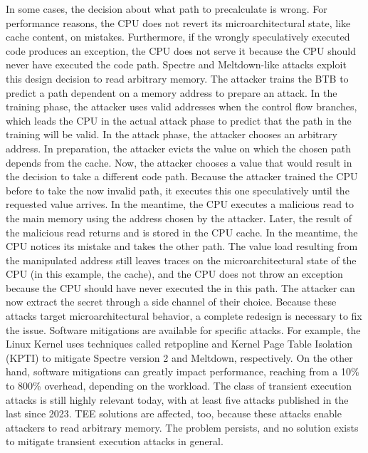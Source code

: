 In some cases, the decision about what path to precalculate is wrong. For
performance reasons, the CPU does not revert its microarchitectural state, like
cache content, on mistakes. Furthermore, if the wrongly speculatively executed
code produces an exception, the CPU does not serve it because the CPU should
never have executed the code path. Spectre and Meltdown-like attacks exploit
this design decision to read arbitrary memory. The attacker trains the BTB to
predict a path dependent on a memory address to prepare an attack. In the
training phase, the attacker uses valid addresses when the control flow
branches, which leads the CPU in the actual attack phase to predict that the
path in the training will be valid. In the attack phase, the attacker chooses an
arbitrary address. In preparation, the attacker evicts the value on which the
chosen path depends from the cache. Now, the attacker chooses a value that would
result in the decision to take a different code path. Because the attacker
trained the CPU before to take the now invalid path, it executes this one
speculatively until the requested value arrives. In the meantime, the CPU
executes a malicious read to the main memory using the address chosen by the
attacker. Later, the result of the malicious read returns and is stored in the
CPU cache. In the meantime, the CPU notices its mistake and takes the other
path. The value load resulting from the manipulated address still leaves traces
on the microarchitectural state of the CPU (in this example, the cache), and the
CPU does not throw an exception because the CPU should have never executed the
in this path. The attacker can now extract the secret through a side channel of
their choice. Because these attacks target microarchitectural behavior, a
complete redesign is necessary to fix the issue. Software mitigations are
available for specific attacks. For example, the Linux Kernel uses techniques
called retpopline and Kernel Page Table Isolation (KPTI) to mitigate Spectre
version 2 and Meltdown, respectively. On the other hand, software mitigations
can greatly impact performance, reaching from a 10\% to 800\% overhead,
depending on the workload.\cite{low2018overview} The class of transient
execution attacks is still highly relevant today, with at least five attacks
published in the last since 2023.
\cite{ormandy2023zenbleed,trujillo2023inception, moghimi2023downfall,ragab_ghostrace_2024, wilke2024tdxdown}
TEE solutions are affected, too, because these attacks enable attackers to read
arbitrary memory. The problem persists, and no solution exists to mitigate
transient execution attacks in general.\\

